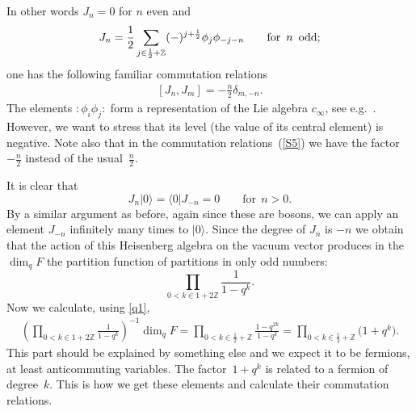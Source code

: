\documentclass[11pt]{article}
\numberwithin{equation}{section}
\begin{document}
In other words  $J_n=0$ for $n$ even and
\[ %
J_n=\frac{1}{2}\sum_{j\in
\frac{1}{2}+\mathbb{Z}}(-)^{j+\frac{1}{2}}\phi_j\phi_{-j-n}\qquad
\mbox{for\,\ $n$\,\ odd;}
\] %
one has the following familiar commutation relations
\begin{gather}
\label{S5} [J_n, J_m]=-\frac{n}{2}\delta_{m,-n} .
\end{gather}
The elements ${:}\phi_i\phi_j{:}$ form a representation of the
Lie algebra $c_\infty$, see e.g.~\cite{Kac-Leur}. However,
we want to stress that its level (the value of its central element) is negative.
Note also that in the commutation relations~(\ref{S5}) we
have the factor $-\frac{n}{2}$ instead of the usual~$\frac{n}{2}$.

It is clear that
\[
J_n|0\rangle=\langle 0|J_{-n}=0\qquad\mbox{for}\ \ n>0 .
\]
By a similar argument as before,
again since these are bosons, we can apply an element $J_{-n}$
inf\/initely many times to $|0\rangle$. Since the degree of $J_n$ is $-n$
 we obtain that the action of this Heisenberg algebra on the vacuum
vector produces in the $\dim_q F$ the partition function of partitions in only odd numbers:
\[
\prod_{0< k\in 1+2\mathbb{Z}}\frac{1}{1-q^k}.
\]
Now we calculate, using \eqref{q1},
\begin{gather}
\left(\prod_{0< k\in
1+2\mathbb{Z}}\frac{1}{1-q^k}\right)^{-1}\dim_q F=
\prod_{0< k\in\frac{1}{2}+\mathbb{Z}}\frac{{1-q^{2k}}}{1-q^k}
=\prod_{0< k\in\frac{1}{2}+\mathbb{Z}}\big(1+q^k\big).\label{q3}
\end{gather}
 This part should be explained by something else and we expect it to be
fermions, at least anticommuting variables. The factor~$1+q^k$
is related to a fermion of degree~$k$. This is how we
get these elements and calculate their commutation relations.
\end{document}
